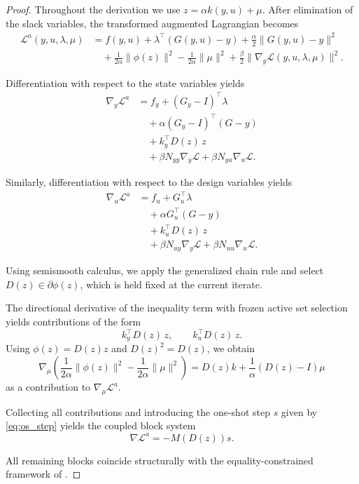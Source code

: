 \documentclass[11pt]{article}
\newcommand{\Lag}{\mathcal L}
\newcommand{\DLag}{\mathcal L^a}
\begin{document}
\begin{proof}
Throughout the derivation we use $z=\alpha k(y,u)+\mu$.
After elimination of the slack variables, the transformed augmented
Lagrangian becomes
\begin{align}
\label{eq:prooflag}
\DLag(y,u,\lambda,\mu)
&=
f(y,u) + \lambda^\top(G(y,u)-y) + \frac{\alpha}{2}\|G(y,u)-y\|^2
\\
&\quad
+ \frac{1}{2\alpha} \| \phi(z) \|^2
- \frac{1}{2\alpha}\|\mu\|^2
+ \frac{\beta}{2} \| \nabla_y\Lag(y,u,\lambda,\mu) \|^2.
\nonumber
\end{align}

Differentiation with respect to the state variables yields
\begin{align*}
\nabla_y \DLag
&=
f_y
+
(G_y-I)^\top\lambda
\\
&\quad
+
\alpha(G_y-I)^\top(G-y)
\\
&\quad
+
k_y^\top D(z)\,z
\\
&\quad
+
\beta N_{yy}\nabla_y\Lag
+
\beta N_{yu}\nabla_u\Lag.
\end{align*}

Similarly, differentiation with respect to the design variables yields
\begin{align*}
\nabla_u \DLag
&=
f_u
+
G_u^\top\lambda
\\
&\quad
+
\alpha G_u^\top(G-y)
\\
&\quad
+
k_u^\top D(z)\,z
\\
&\quad
+
\beta N_{uy}\nabla_y\Lag
+
\beta N_{uu}\nabla_u\Lag.
\end{align*}

Using semismooth calculus, we apply the generalized chain rule and select
$D(z)\in \partial \phi(z)$, which is held fixed at the current iterate.

The directional derivative of the inequality term with frozen active set selection yields contributions of the form
\[
k_y^\top D(z)\,z, \qquad k_u^\top D(z)\,z.
\]
Using $\phi(z)=D(z)z$ and $D(z)^2=D(z)$,
we obtain
\[
\nabla_\mu
\left(
\frac1{2\alpha}\|\phi(z)\|^2
-\frac1{2\alpha}\|\mu\|^2
\right)
=
D(z)k
+\frac1\alpha(D(z)-I)\mu
\]
as a contribution to $\nabla_\mu \DLag. $

Collecting all contributions and introducing the one-shot step $s$ given by \eqref{eq:os_step}
yields the coupled block system
\[
\nabla \DLag = -M(D(z))s.
\]

All remaining blocks coincide structurally with the
equality-constrained framework of \cite{walther2018equality}.

\end{proof}
\end{document}
